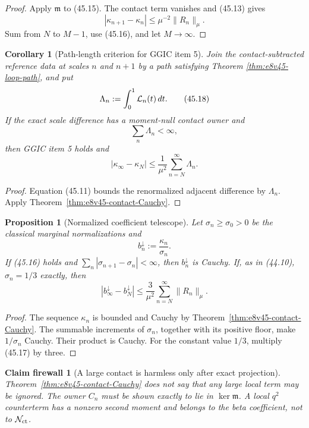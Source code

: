 \documentclass[11pt,oneside]{book}
\newtheorem{proposition}[theorem]{Proposition}
\newtheorem{corollary}[theorem]{Corollary}
\newtheorem{firewall}[theorem]{Claim firewall}
\theoremstyle{definition}
\theoremstyle{remark}
\begin{document}
\begin{proof}
Apply \({\mathfrak m}\) to (45.15).  The contact term vanishes and
(45.13) gives
\[
 |\kappa_{n+1}-\kappa_n|
 \le\mu^{-2}\|R_n\|_\mu.
\]
Sum from \(N\) to \(M-1\), use (45.16), and let \(M\to\infty\).
\end{proof}

\begin{corollary}[Path-length criterion for GGIC item 5]
\label{cor:e8v45-GGIC5}
Join the contact-subtracted reference data at scales \(n\) and
\(n+1\) by a path satisfying Theorem
\ref{thm:e8v45-loop-path}, and put
\[
 \Lambda_n:=\int_0^1{\cal L}_n(t)\,dt.                          \tag{45.18}
\]
If the exact scale difference has a moment-null contact owner and
\[
 \sum_n\Lambda_n<\infty,                                       \tag{45.19}
\]
then GGIC item 5 holds and
\[
 |\kappa_\infty-\kappa_N|
 \le\frac1{\mu^2}\sum_{n=N}^\infty\Lambda_n.                   \tag{45.20}
\]
\end{corollary}

\begin{proof}
Equation (45.11) bounds the renormalized adjacent difference by
\(\Lambda_n\).  Apply
Theorem~\ref{thm:e8v45-contact-Cauchy}.
\end{proof}

\begin{proposition}[Normalized coefficient telescope]
\label{prop:e8v45-normalized-Cauchy}
Let \(\sigma_n\ge\sigma_0>0\) be the classical marginal
normalizations and
\[
 b_n^\downarrow:=\frac{\kappa_n}{\sigma_n}.                    \tag{45.21}
\]
If (45.16) holds and
\(\sum_n|\sigma_{n+1}-\sigma_n|<\infty\), then
\(b_n^\downarrow\) is Cauchy.  If, as in (44.10),
\(\sigma_n=1/3\) exactly, then
\[
 \boxed{
 |b_\infty^\downarrow-b_N^\downarrow|
 \le\frac3{\mu^2}\sum_{n=N}^\infty\|R_n\|_\mu.}                \tag{45.22}
\]
\end{proposition}

\begin{proof}
The sequence \(\kappa_n\) is bounded and Cauchy by
Theorem~\ref{thm:e8v45-contact-Cauchy}.  The summable increments of
\(\sigma_n\), together with its positive floor, make \(1/\sigma_n\)
Cauchy.  Their product is Cauchy.  For the constant value \(1/3\),
multiply (45.17) by three.
\end{proof}

\begin{firewall}[A large contact is harmless only after exact
projection]
\label{fire:e8v45-contact-exact}
Theorem~\ref{thm:e8v45-contact-Cauchy} does not say that any large
local term may be ignored.  The owner \(C_n\) must be shown exactly
to lie in \(\ker{\mathfrak m}\).  A local \(q^2\) counterterm has a
nonzero second moment and belongs to the beta coefficient, not to
\({\cal N}_{\rm ct}\).
\end{firewall}
\end{document}
